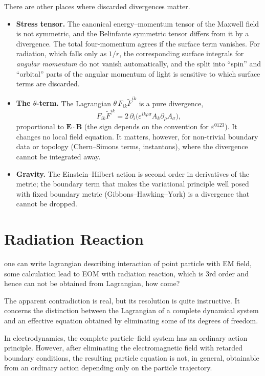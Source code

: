 There are other places where discarded divergences matter.
\begin{itemize}
\item \textbf{Stress tensor.} The canonical energy--momentum tensor of the
Maxwell field is not symmetric, and the Belinfante symmetric tensor differs
from it by a divergence. The total four-momentum agrees if the surface term
vanishes. For radiation, which falls only as $1/r$, the corresponding
surface integrals for \emph{angular momentum} do not vanish automatically,
and the split into ``spin'' and ``orbital'' parts of the angular
momentum of light is sensitive to which surface terms are discarded.
\item \textbf{The $\theta$-term.} The Lagrangian $\theta\,F_{ik}\tilde F^{ik}$ is a pure divergence,
\begin{equation*}
F_{ik}\tilde F^{ik}=2\,\partial_i\big(\varepsilon^{ik\rho\sigma}A_k\partial_\rho A_\sigma\big),
\end{equation*}
proportional to $\mathbf E\cdot\mathbf B$ (the sign depends on the convention
for $\varepsilon^{0123}$). It changes no local field equation. It matters,
however, for non-trivial boundary data or topology (Chern--Simons terms,
instantons), where the divergence cannot be integrated away.
\item \textbf{Gravity.} The Einstein--Hilbert action is second order in
derivatives of the metric; the boundary term that makes the variational
principle well posed with fixed boundary metric (Gibbons--Hawking--York) is
a divergence that cannot be dropped.
\end{itemize}


\section{Radiation Reaction}
one can write lagrangian describing interaction of point particle with EM
field, some calculation lead to EOM with radiation reaction, which is 3rd order
and hence can not be obtained from Lagrangian, how come?

The apparent contradiction is real, but its resolution is quite instructive. It
concerns the distinction between the Lagrangian of a complete dynamical system
and an effective equation obtained by eliminating some of its degrees of
freedom.

In electrodynamics, the complete particle–field system has an ordinary action
principle. However, after eliminating the electromagnetic field with retarded
boundary conditions, the resulting particle equation is not, in general,
obtainable from an ordinary action depending only on the particle trajectory.

